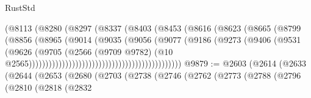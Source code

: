 \begin{lexlean}{RustStd}
\begin{coremodule}
                                                (@8113
                                                  (@8280
                                                    (@8297
                                                      (@8337
                                                        (@8403
                                                          (@8453
                                                            (@8616
                                                              (@8623
                                                                (@8665
                                                                  (@8799
                                                                    (@8856
                                                                      (@8965
                                                                        (@9014
                                                                          (@9035
                                                                            (@9056
                                                                              (@9077
                                                                                (@9186
                                                                                  (@9273
                                                                                    (@9406
                                                                                      (@9531
                                                                                        (@9626
                                                                                          (@9705
                                                                                            (@2566
                                                                                              (@9709
                                                                                                @9782)
                                                                                              (@10
                                                                                                @2565))))))))))))))))))))))))))))))))))))))))))))))
@9879 := @2603
    (@2614
      (@2633
        (@2644
          (@2653
            (@2680
              (@2703
                (@2738
                  (@2746
                    (@2762
                      (@2773
                        (@2788
                          (@2796
                            (@2810
                              (@2818
                                (@2832

\end{coremodule}
\end{lexlean}
